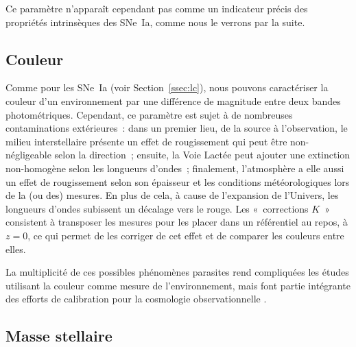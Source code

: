 \documentclass[../main/main.tex]{subfiles}
\begin{document}
Ce paramètre n'apparaît cependant pas comme un indicateur précis des propriétés
intrinsèques des SNe~Ia, comme nous le verrons par la suite.

\subsection{Couleur}\label{ssec:chost}

Comme pour les SNe~Ia (voir Section~\ref{ssec:lc}), nous pouvons caractériser la
couleur d'un environnement par une différence de magnitude entre deux bandes
photométriques. Cependant, ce paramètre est sujet à de nombreuses contaminations
extérieures~: dans un premier lieu, de la source à l'observation, le milieu
interstellaire présente un effet de rougissement qui peut être non-négligeable
selon la direction~; ensuite, la Voie Lactée peut ajouter une extinction
non-homogène selon les longueurs d'ondes~; finalement, l'atmosphère a elle aussi
un effet de rougissement selon son épaisseur et les conditions météorologiques
lors de la (ou des) mesures. En plus de cela, à cause de l'expansion de
l'Univers, les longueurs d'ondes subissent un décalage vers le rouge. Les
«~corrections $K$~» consistent à transposer les mesures pour les placer dans un
référentiel au repos, à $z=0$, ce qui permet de les corriger de cet effet et de
comparer les couleurs entre elles.

La multiplicité de ces possibles phénomènes parasites rend compliquées les
études utilisant la couleur comme mesure de l'environnement, mais font partie
intégrante des efforts de calibration pour la cosmologie observationnelle
\citep{fitzpatrick1999, schlafly2011, popovic2021b}.

\subsection{Masse stellaire}\label{ssec:mhost}
\end{document}
